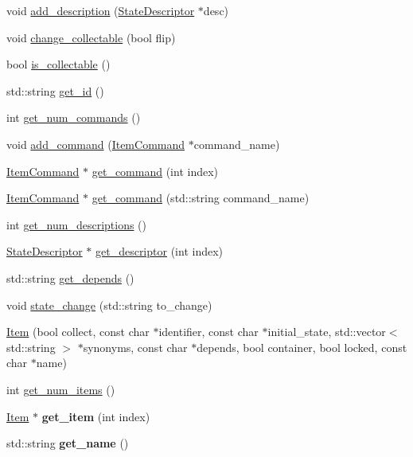 \begin{DoxyCompactItemize}
\item 
void \hyperlink{class_item_af6e0efea4346f669ac5479b258511e68}{add\-\_\-description} (\hyperlink{class_state_descriptor}{\-State\-Descriptor} $\ast$desc)
\item 
void \hyperlink{class_item_ab8c43c172fbff161c8c2ca765ded9537}{change\-\_\-collectable} (bool flip)
\item 
bool \hyperlink{class_item_a91f14a96cab681bc02dee3f9c9e6af5d}{is\-\_\-collectable} ()
\item 
std\-::string \hyperlink{class_item_a7a3aedd7ab7f81327f57343dcb55d42d}{get\-\_\-id} ()
\item 
int \hyperlink{class_item_a9f09c704274546d5bd0903d0cddfd194}{get\-\_\-num\-\_\-commands} ()
\item 
void \hyperlink{class_item_ab78d891c3aed983ea7b2e5311b0da68c}{add\-\_\-command} (\hyperlink{class_item_command}{\-Item\-Command} $\ast$command\-\_\-name)
\item 
\hyperlink{class_item_command}{\-Item\-Command} $\ast$ \hyperlink{class_item_a2d460d0ac5130e9fd5c05bd3d823a224}{get\-\_\-command} (int index)
\item 
\hyperlink{class_item_command}{\-Item\-Command} $\ast$ \hyperlink{class_item_a62cc63f4b60feeb555226eceb851d7de}{get\-\_\-command} (std\-::string command\-\_\-name)
\item 
int \hyperlink{class_item_a41e3300333fa679000fa94f6d5073268}{get\-\_\-num\-\_\-descriptions} ()
\item 
\hyperlink{class_state_descriptor}{\-State\-Descriptor} $\ast$ \hyperlink{class_item_a53ca85af0ed1581f08b7cb143ea9474c}{get\-\_\-descriptor} (int index)
\item 
std\-::string \hyperlink{class_item_abccfd47cb27c2631d90e44a7341bb3b3}{get\-\_\-depends} ()
\item 
void \hyperlink{class_item_a3ec1f16ad405a8ddf9ae82a48de551ff}{state\-\_\-change} (std\-::string to\-\_\-change)
\item 
\hyperlink{class_item_a434bfe64181261c9e4b69db7863b947e}{\-Item} (bool collect, const char $\ast$identifier, const char $\ast$initial\-\_\-state, std\-::vector$<$ std\-::string $>$ $\ast$synonyms, const char $\ast$depends, bool container, bool locked, const char $\ast$name)
\item 
int \hyperlink{class_item_a5c0702ac713015d393aa00304ac56dd6}{get\-\_\-num\-\_\-items} ()
\item 
\hypertarget{class_item_ac60146c5a0b1dfc8147607cdce6fc7de}{
\hyperlink{class_item}{\-Item} $\ast$ {\bfseries get\-\_\-item} (int index)}
\label{class_item_ac60146c5a0b1dfc8147607cdce6fc7de}

\item 
\hypertarget{class_item_a2ba411f27235d4061d28569d59b74d41}{
std\-::string {\bfseries get\-\_\-name} ()}
\label{class_item_a2ba411f27235d4061d28569d59b74d41}

\end{DoxyCompactItemize}
